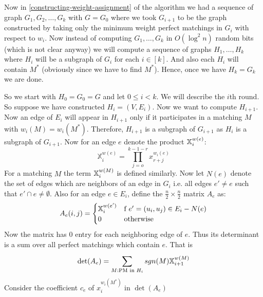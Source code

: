 Now in \autoref{constructing-weight-assignment} of the  algorithm we had a sequence of graph $G_1,G_2,\dots, G_{k}$ with $G=G_0$ where we took $G_{i+1}$ to be the graph constructed by taking only the minimum weight perfect matchings in $G_{i}$ with respect to $w_{i}$. Now instead of computing $G_1,\dots, G_k$ in $O(\log^2n)$ random bits (which is not clear anyway) we will compute a sequence of graphs $H_1,\dots, H_k$ where $H_{i}$ will be a subgraph of $G_{i}$ for each $i\in[k]$. And also each $H_i$ will contain $M^*$ (obviously since we have to find $M^*$). Hence, once we have $H_k=G_k$ we are done.

So we start with $H_0=G_0=G$ and let $0\leq i<k$. We will describe the $i$th round. So suppose we have constructed $H_i=(V,E_i)$. Now we want to compute $H_{i+1}$. Now an edge of $E_i$ will appear in $H_{i+1}$ only if it participates in a matching $M$ with $w_i(M)=w_i(M^*)$. Therefore, $H_{i+1}$ is a subgraph of $G_{i+1}$ as $H_i$ is a subgraph of $G_{i+1}$. Now for an edge $e$ denote the product $\mathbb{X}_i^{w(e)}$:\[
	 \mathbb{X}_i^{w(e)}= \prod_{j=o}^{k-1-r}x_{r+j}^{w_i(e)}
\]For a matching $M$ the term $\mathbb{X}^{w(M)}_i$ is defined similarly. Now let $N(e)$ denote the set of edges which are neighbors of an edge in $G_i$ i.e. all edges $e'\neq e$ such that $e'\cap e\neq \emptyset$. Also for an edge $e\in E_i$, define the $\frac{n}{2}\times \frac{n}{2}$ matrix $A_e$ as:\[
	 A_e(i,j)=\begin{cases}
	 \mathbb{X}^{w(e')}_i & \text{f $e'=(u_i,u_j)\in E_i-N(e)$}\\ 
	 0 & \text{otherwise}	 
	 \end{cases}
\]
Now the matrix has $0$ entry for each neighboring edge of $e$. Thus its determinant is a sum over all perfect matchings which contain $e$. That is\[
	 \det(A_e)= \sum\limits_{M:\text{PM in $H_i$}}^{} sgn(M)\mathbb{X}_{i+1}^{w(M)} 
\]Consider the coefficient $c_e$ of $x_i^{w_i(M^*)}$ in $\det(A_e)$ 

